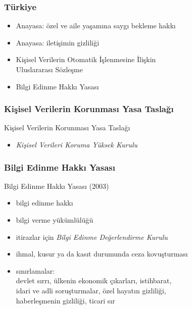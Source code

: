 \documentclass[dvipsnames]{beamer}
\theoremstyle{definition}
\theoremstyle{example}
\theoremstyle{plain}
\begin{document}
\begin{frame}
  \frametitle{Türkiye}

  \begin{itemize}
    \item Anayasa: özel ve aile yaşamına saygı bekleme hakkı
    \item Anayasa: iletişimin gizliliği
    \item Kişisel Verilerin Otomatik İşlenmesine İlişkin\\
      Uluslararası Sözleşme
    \item Bilgi Edinme Hakkı Yasası
  \end{itemize}
\end{frame}

\begin{frame}
  \frametitle{Kişisel Verilerin Korunması Yasa Taslağı}

  \begin{block}{Kişisel Verilerin Korunması Yasa Taslağı}
    \begin{itemize}
      \item \emph{Kişisel Verileri Koruma Yüksek Kurulu}
    \end{itemize}
  \end{block}
\end{frame}

\begin{frame}
  \frametitle{Bilgi Edinme Hakkı Yasası}

  \begin{block}{Bilgi Edinme Hakkı Yasası (2003)}
    \begin{itemize}
      \item bilgi edinme hakkı
      \item bilgi verme yükümlülüğü
      \item itirazlar için \emph{Bilgi Edinme Değerlendirme Kurulu}
      \item ihmal, kusur ya da kasıt durumunda ceza kovuşturması

      \pause
      \item sınırlamalar:\\
        devlet sırrı, ülkenin ekonomik çıkarları, istihbarat,\\
        idari ve adli soruşturmalar, özel hayatın gizliliği,\\
        haberleşmenin gizliliği, ticari sır
    \end{itemize}
  \end{block}
\end{frame}
\end{document}
